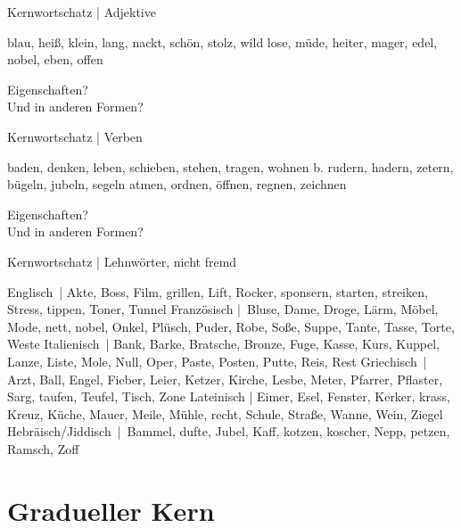 \begin{frame}
  {Kernwortschatz | Adjektive}
  \onslide<+->
  \onslide<+->
  \begin{exe}
    \ex blau, heiß, klein, lang, nackt, schön, stolz, wild
    \onslide<+->
    \ex lose, müde, heiter, mager, edel, nobel, eben, offen
  \end{exe}
  \onslide<+->
  \Zeile
  Eigenschaften?\\
  \onslide<+->
  \Halbzeile
  Und in anderen Formen?
\end{frame}

\begin{frame}
  {Kernwortschatz | Verben}
  \onslide<+->
  \onslide<+->
  \begin{exe}
  \ex baden, denken, leben, schieben, stehen, tragen, wohnen b. rudern, hadern, zetern, bügeln, jubeln, segeln
  \ex atmen, ordnen, öffnen, regnen, zeichnen
  \end{exe}
  \onslide<+->
  \Zeile
  Eigenschaften?\\
  \onslide<+->
  \Halbzeile
  Und in anderen Formen?
\end{frame}

\begin{frame}
  {Kernwortschatz | Lehnwörter, nicht fremd}
  \onslide<+->
  \onslide<+->
  \begin{exe}
    \ex \alert{Englisch} | Akte, Boss, Film, grillen, Lift, Rocker, sponsern, starten, streiken, Stress, tippen, Toner, Tunnel
    \onslide<+->
    \ex \alert{Französisch} | Bluse, Dame, Droge, Lärm, Möbel, Mode, nett, nobel, Onkel, Plüsch, Puder, Robe, Soße, Suppe, Tante, Tasse, Torte, Weste
    \onslide<+->
    \ex \alert{Italienisch} | Bank, Barke, Bratsche, Bronze, Fuge, Kasse, Kurs, Kuppel, Lanze, Liste, Mole, Null, Oper, Paste, Posten, Putte, Reis, Rest
    \onslide<+->
    \ex \alert{Griechisch} | Arzt, Ball, Engel, Fieber, Leier, Ketzer, Kirche, Lesbe, Meter, Pfarrer, Pflaster, Sarg, taufen, Teufel, Tisch, Zone
    \onslide<+->
    \ex \alert{Lateinisch} | Eimer, Esel, Fenster, Kerker, krass, Kreuz, Küche, Mauer, Meile, Mühle, recht, Schule, Straße, Wanne, Wein, Ziegel
    \onslide<+->
    \ex \alert{Hebräisch\slash Jiddisch} | Bammel, dufte, Jubel, Kaff, kotzen, koscher, Nepp, petzen, Ramsch, Zoff
  \end{exe}
\end{frame}

\section{Gradueller Kern}

